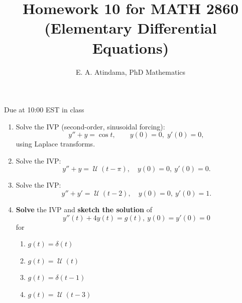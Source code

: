 \documentclass[a4paper,11pt,reqno]{amsart}
\title[MATH 2860 (Elementary Differential Equations)]{Homework 10 for MATH 2860 (Elementary Differential Equations)}
\author[Emmanuel Atindama]{E. A. Atindama, PhD Mathematics}
\numberwithin{equation}{section}
\DeclareMathOperator{\hstep}{\mathscr{U}}
\begin{document}
\maketitle

Due at 10:00 EST in class

\begin{enumerate}[1.]
  \item Solve the IVP (second-order, sinusoidal forcing):
      \[
      y''+y=\cos t,\qquad y(0)=0,\; y'(0)=0,
      \]
      using Laplace transforms.
    \begin{center}\setlength{\fboxsep}{10pt}
    \end{center}


  \item Solve the IVP:
      \[
      y'' + y = \hstep(t-\pi), \quad y(0)=0,\ y'(0)=0.
      \]
    \begin{center}\setlength{\fboxsep}{10pt}
    \end{center}


  \item Solve the IVP:
       \[
      y'' + y' = \hstep(t-2), \quad y(0)=0,\ y'(0)=1.
      \]
    \begin{center}\setlength{\fboxsep}{10pt}
    \end{center}


  \item \textbf{Solve} the IVP and \textbf{sketch the solution} of
      \[
        y''(t) + 4 y(t) = g(t),\ y(0)=y'(0)=0
      \]
      for

      \begin{enumerate}
        \item \(g(t) = \delta(t)\) 
        \item \(g(t) = \hstep(t)\) 
        \item \(g(t) = \delta(t-1)\) 
        \item \(g(t) = \hstep(t-3)\)
      \end{enumerate}
    \begin{center}\setlength{\fboxsep}{10pt}
    \end{center}
\end{enumerate}
  
\end{document}
